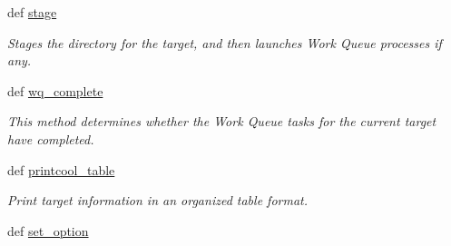 \begin{DoxyCompactItemize}
\item 
def \hyperlink{classforcebalance_1_1target_1_1Target_af8d2a4658c87841e40296795aec478bb}{stage}
\begin{DoxyCompactList}\small\item\em \-Stages the directory for the target, and then launches \-Work \-Queue processes if any. \end{DoxyCompactList}\item 
def \hyperlink{classforcebalance_1_1target_1_1Target_af6099ec09486213869dba2491bd8ea04}{wq\-\_\-complete}
\begin{DoxyCompactList}\small\item\em \-This method determines whether the \-Work \-Queue tasks for the current target have completed. \end{DoxyCompactList}\item 
def \hyperlink{classforcebalance_1_1target_1_1Target_ac30a4e9d7d9fe06f7caefa5f7cfab09b}{printcool\-\_\-table}
\begin{DoxyCompactList}\small\item\em \-Print target information in an organized table format. \end{DoxyCompactList}\item 
def \hyperlink{classforcebalance_1_1BaseClass_a73e9a37a7632e79eb99f49bd15aced45}{set\-\_\-option}
\end{DoxyCompactItemize}

